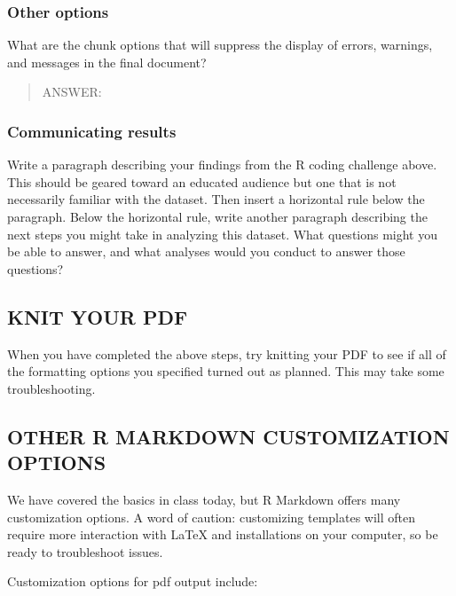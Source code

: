 \documentclass[]{article}
\begin{document}
\hypertarget{other-options}{%
\subsubsection{Other options}\label{other-options}}

What are the chunk options that will suppress the display of errors,
warnings, and messages in the final document?

\begin{quote}
ANSWER:
\end{quote}

\hypertarget{communicating-results}{%
\subsubsection{Communicating results}\label{communicating-results}}

Write a paragraph describing your findings from the R coding challenge
above. This should be geared toward an educated audience but one that is
not necessarily familiar with the dataset. Then insert a horizontal rule
below the paragraph. Below the horizontal rule, write another paragraph
describing the next steps you might take in analyzing this dataset. What
questions might you be able to answer, and what analyses would you
conduct to answer those questions?

\hypertarget{knit-your-pdf}{%
\subsection{KNIT YOUR PDF}\label{knit-your-pdf}}

When you have completed the above steps, try knitting your PDF to see if
all of the formatting options you specified turned out as planned. This
may take some troubleshooting.

\hypertarget{other-r-markdown-customization-options}{%
\subsection{OTHER R MARKDOWN CUSTOMIZATION
OPTIONS}\label{other-r-markdown-customization-options}}

We have covered the basics in class today, but R Markdown offers many
customization options. A word of caution: customizing templates will
often require more interaction with LaTeX and installations on your
computer, so be ready to troubleshoot issues.

Customization options for pdf output include:
\end{document}

